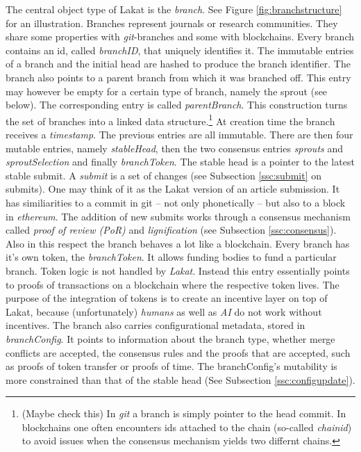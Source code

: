 \documentclass[14pt]{article}
\newcommand{\remark}[1]{{\color{purple} (#1)}}
\begin{document}
The central object type of Lakat is the \textit{branch}. See Figure \ref{fig:branchstructure} for an illustration. Branches represent journals or research communities. They share some properties with \textit{git}-branches and some with blockchains. Every branch contains an id, called \textit{branchID}, that uniquely identifies it. The immutable entries of a branch and the initial head are hashed to produce the branch identifier. The branch also points to a parent branch from which it was branched off. This entry may however be empty for a certain type of branch, namely the sprout (see below). The corresponding entry is called \textit{parentBranch}. This construction turns the set of branches into a linked data structure.\footnote{\remark{Maybe check this} In \textit{git} a branch is simply pointer to the head commit. In blockchains one often encounters ids attached to the chain (so-called \textit{chainid}) to avoid issues when the consensus mechanism yields two differnt chains.} At creation time the branch receives a \textit{timestamp}. The previous entries are all immutable. There are then four mutable entries, namely \textit{stableHead}, then the two consensus entries \textit{sprouts} and \textit{sproutSelection} and finally \textit{branchToken}. The stable head is a pointer to the latest stable submit. A \textit{submit} is a set of changes (see Subsection \ref{ssc:submit} on submits). One may think of it as the Lakat version of an article submission. It has similiarities to a commit in git -- not only phonetically -- but also to a block in \textit{ethereum}. The addition of new submits works through a consensus mechanism called \textit{proof of review (PoR)} and \textit{lignification} (see Subsection \ref{ssc:consensus}). Also in this respect the branch behaves a lot like a blockchain. Every branch has it's own token, the \textit{branchToken}. It allows funding bodies to fund a particular branch. Token logic is not handled by \textit{Lakat}. Instead this entry essentially points to proofs of transactions on a blockchain where the respective token lives. The purpose of the integration of tokens is to create an incentive layer on top of Lakat, because (unfortunately) \textit{humans} as well as \textit{AI} do not work without incentives. The branch also carries configurational metadata, stored in \textit{branchConfig}. It points to information about the branch type, whether merge conflicts are accepted, the consensus rules and the proofs that are accepted, such as proofs of token transfer or proofs of time. The branchConfig's mutability is more constrained than that of the stable head (See Subsection \ref{ssc:configupdate}).
\end{document}
